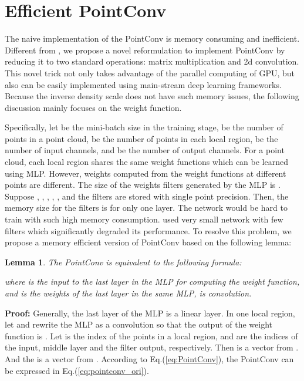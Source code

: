 \documentclass[10pt,twocolumn,letterpaper]{article}
\newtheorem{lemma}[theorem]{Lemma}
\begin{document}
\section{Efficient PointConv} \label{IMP}

The naive implementation of the PointConv is memory consuming and inefficient. Different from \cite{simonovsky2017dynamic}, we propose a novel reformulation to implement PointConv by reducing it to two standard operations: matrix multiplication and 2d convolution. This novel trick not only takes advantage of the parallel computing of GPU, but also can be easily implemented using main-stream deep learning frameworks. Because the inverse density scale does not have such memory issues, the following discussion mainly focuses on the weight function.

Specifically, let  be the mini-batch size in the training stage,  be the number of points in a point cloud,  be the number of points in each local region,  be the number of input channels, and  be the number of output channels. For a point cloud, each local region shares the same weight functions which can be learned using MLP. However, weights computed from the weight functions at different points are different. The size of the weights filters generated by the MLP is . Suppose , , , , , and the filters are stored with single point precision. Then, the memory size for the filters is  for only one layer. The network would be hard to train with such high memory consumption. \cite{simonovsky2017dynamic} used very small network with few filters which significantly degraded its performance. To resolve this problem, we propose a memory efficient version of PointConv based on the following lemma:

\vspace{-0.1in}
\begin{lemma}
\label{le:me}
The PointConv is equivalent to the following formula:

where  is the input to the last layer in the MLP for computing the weight function, and  is the weights of the last layer in the same MLP,  is  convolution.
\vspace{-0.1in}
\end{lemma}

\noindent \textbf{Proof:} Generally, the last layer of the MLP is a linear layer. In one local region, let  and rewrite the MLP as a  convolution so that the output of the weight function is . Let  is the index of the points in a local region, and  are the indices of the input, middle layer and the filter output, respectively. Then  is a vector from . And the  is a vector from . According to Eq.(\ref{eq:PointConv}), the PointConv can be expressed in Eq.(\ref{eq:pointconv_ori}).
\end{document}
